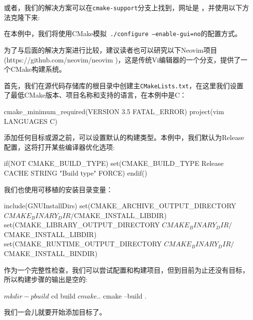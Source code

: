 或者，我们的解决方案可以在\texttt{cmake-support}分支上找到，网址是  ，并使用以下方法克隆下来:


在本例中，我们将使用CMake模拟\texttt{ ./configure --enable-gui=no}的配置方式。

为了与后面的解决方案进行比较，建议读者也可以研究以下Neovim项目(https://github.com/neovim/neovim )，这是传统Vi编辑器的一个分支，提供了一个CMake构建系统。


首先，我们在源代码存储库的根目录中创建主\texttt{CMakeLists.txt}，在这里我们设置了最低CMake版本、项目名称和支持的语言，在本例中是C：

\begin{codebox}[cmake]
cmake_minimum_required(VERSION
3.5 FATAL_ERROR)
project(vim LANGUAGES C)
\end{codebox}

添加任何目标或源之前，可以设置默认的构建类型。本例中，我们默认为Release配置，这将打开某些编译器优化选项:

\begin{codebox}[cmake]
if(NOT CMAKE_BUILD_TYPE)
    set(CMAKE_BUILD_TYPE Release CACHE STRING "Build type" FORCE)
endif()
\end{codebox}

我们也使用可移植的安装目录变量：

\begin{codebox}[cmake]
include(GNUInstallDirs)
set(CMAKE_ARCHIVE_OUTPUT_DIRECTORY
    ${CMAKE_BINARY_DIR}/${CMAKE_INSTALL_LIBDIR})
set(CMAKE_LIBRARY_OUTPUT_DIRECTORY
    ${CMAKE_BINARY_DIR}/${CMAKE_INSTALL_LIBDIR})
set(CMAKE_RUNTIME_OUTPUT_DIRECTORY
    ${CMAKE_BINARY_DIR}/${CMAKE_INSTALL_BINDIR})
\end{codebox}

作为一个完整性检查，我们可以尝试配置和构建项目，但到目前为止还没有目标，所以构建步骤的输出是空的:

\begin{codebox}[shell]
$ mkdir -p build
$ cd build
$ cmake ..
$ cmake --build .
\end{codebox}

我们一会儿就要开始添加目标了。


